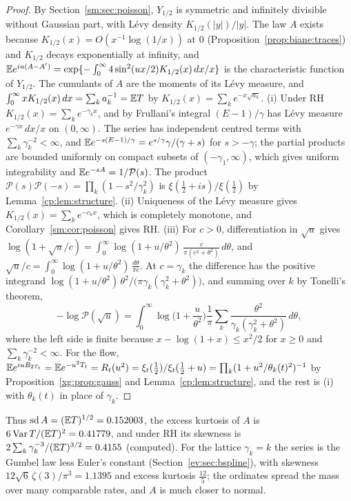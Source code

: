 \begin{proof}
By Section~\ref{sm:sec:poisson}, $Y_{1/2}$ is symmetric and infinitely divisible without Gaussian part, with L\'evy density $K_{1/2}(|y|)/|y|$. The law $A$ exists because $K_{1/2}(x)=O(x^{-1}\log(1/x))$ at $0$ (Proposition~\ref{prop:biane:traces}) and $K_{1/2}$ decays exponentially at infinity, and $\mathbb{E} e^{iu(A-A')}=\exp\{-\int_0^\infty4\sin^2(ux/2)K_{1/2}(x)\,dx/x\}$ is the characteristic function of $Y_{1/2}$. The cumulants of $A$ are the moments of its L\'evy measure, and $\int_0^\infty xK_{1/2}(x)\,dx=\sum_ka_k^{-1}=\mathbb{E} T$ by $K_{1/2}(x)=\sum_ke^{-x\sqrt{a_k}}$. (i) Under RH $K_{1/2}(x)=\sum_ke^{-\gamma_kx}$, and by Frullani's integral $(E-1)/\gamma$ has L\'evy measure $e^{-\gamma x}\,dx/x$ on $(0,\infty)$. The series has independent centred terms with $\sum_k\gamma_k^{-2}<\infty$, and $\mathbb{E} e^{-s(E-1)/\gamma}=e^{s/\gamma}\gamma/(\gamma+s)$ for $s>-\gamma$; the partial products are bounded uniformly on compact subsets of $(-\gamma_1,\infty)$, which gives uniform integrability and $\mathbb{E} e^{-sA}=1/\mathcal P(s)$. The product $\mathcal P(s)\mathcal P(-s)=\prod_k(1-s^2/\gamma_k^2)$ is $\xi(\frac12+is)/\xi(\frac12)$ by Lemma~\ref{cp:lem:structure}. (ii) Uniqueness of the L\'evy measure gives $K_{1/2}(x)=\sum_ke^{-c_kx}$, which is completely monotone, and Corollary~\ref{sm:cor:poisson} gives RH. (iii) For $c>0$, differentiation in $\sqrt u$ gives $\log(1+\sqrt u/c)=\int_0^\infty\log(1+u/\theta^2)\,\frac{c}{\pi(c^2+\theta^2)}\,d\theta$, and $\sqrt u/c=\int_0^\infty\log(1+u/\theta^2)\,\frac{d\theta}{\pi c}$. At $c=\gamma_k$ the difference has the positive integrand $\log(1+u/\theta^2)\,\theta^2/\big(\pi\gamma_k(\gamma_k^2+\theta^2)\big)$, and summing over $k$ by Tonelli's theorem,
\[
-\log \mathcal P(\sqrt u)=\int_0^\infty\log\Big(1+\frac u{\theta^2}\Big)\frac1\pi\sum_k\frac{\theta^2}{\gamma_k(\gamma_k^2+\theta^2)}\,d\theta,
\]
where the left side is finite because $x-\log(1+x)\le x^2/2$ for $x\ge0$ and $\sum_k\gamma_k^{-2}<\infty$. For the flow, $\mathbb{E} e^{iuB_{2T_t}}=\mathbb{E} e^{-u^2T_t}=R_t(u^2)=\xi_t(\frac12)/\xi_t(\frac12+u)=\prod_k(1+u^2/\theta_k(t)^2)^{-1}$ by Proposition~\ref{xg:prop:gauss} and Lemma~\ref{cp:lem:structure}, and the rest is (i) with $\theta_k(t)$ in place of $\gamma_k$.
\end{proof}

Thus $\operatorname{sd}A=(\mathbb{E} T)^{1/2}=0.152003$, the excess kurtosis of $A$ is $6\operatorname{Var}T/(\mathbb{E} T)^2=0.41779$, and under RH its skewness is $2\sum_k\gamma_k^{-3}/(\mathbb{E} T)^{3/2}=0.4155$ (computed). For the lattice $\gamma_k=k$ the series is the Gumbel law less Euler's constant (Section~\ref{ev:sec:bspline}), with skewness $12\sqrt6\,\zeta(3)/\pi^3=1.1395$ and excess kurtosis $\frac{12}5$; the ordinates spread the mass over many comparable rates, and $A$ is much closer to normal.

